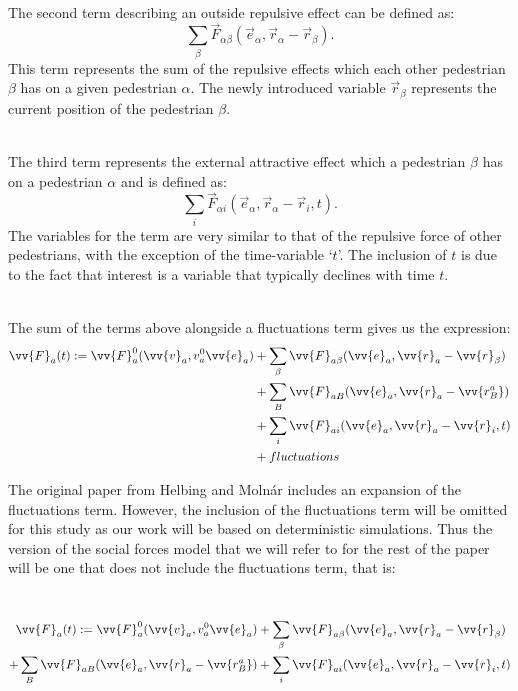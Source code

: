 \documentclass{kththesis}
\begin{document}
\noindent
\\
The second term describing an outside repulsive effect can be defined as: 
\[
\sum_\beta \vec{F}_{\alpha \beta} \left( \vec{e}_{\alpha}, \vec{r}_{\alpha} - \vec{r}_{\beta}\right).
\] 
This term represents the sum of the repulsive effects which each other pedestrian $\beta$ has on a given pedestrian $\alpha$. The newly introduced variable $\vec{r}_\beta$ represents the current position of the pedestrian $\beta$.

\noindent
\\
The third term represents the external attractive effect which a pedestrian $\beta$ has on a pedestrian $\alpha$ and is defined as:
\[
\sum_i \vec{F}_{\alpha i} \left( \vec{e}_{\alpha}, \vec{r}_{\alpha} - \vec{r}_{i}, t \right).
\]
The variables for the term are very similar to that of the repulsive force of other pedestrians, with the exception of the time-variable ‘$t$’. The inclusion of $t$ is due to the fact that interest is a variable that typically declines with time $t$.


\noindent
\\
The sum of the terms above alongside a fluctuations term gives us the expression:
\begin{align*}
\vv{F}_a(t) := 
\vv{F}_a^0(\vv{v}_a, {v}_a^0 \vv{e}_a) 
&+ \sum_{\beta} \vv{F}_{a\beta}(\vv{e}_a, \vv{r}_a - \vv{r}_{\beta}) \\
&+ \sum_{B} \vv{F}_{aB}(\vv{e}_a, \vv{r}_a - \vv{r_B^a}) \\
&+ \sum_{i} \vv{F}_{ai}(\vv{e}_a, \vv{r}_a - \vv{r}_i, t) \\
&+ fluctuations
\end{align*}

\noindent
The original paper from Helbing and Molnár includes an expansion of the fluctuations term. However, the inclusion of the fluctuations term will be omitted for this study as our work will be based on deterministic simulations. Thus the version of the social forces model that we will refer to for the rest of the paper will be one that does not include the fluctuations term, that is:

\noindent
\\
\begin{align*}
\vv{F}_a(t) := 
\vv{F}_a^0(\vv{v}_a, {v}_a^0 \vv{e}_a) 
&+ \sum_{\beta} \vv{F}_{a\beta}(\vv{e}_a, \vv{r}_a - \vv{r}_{\beta}) \\
+ \sum_{B} \vv{F}_{aB}(\vv{e}_a, \vv{r}_a - \vv{r_B^a}) 
&+ \sum_{i} \vv{F}_{ai}(\vv{e}_a, \vv{r}_a - \vv{r}_i, t)
\end{align*}
\end{document}
